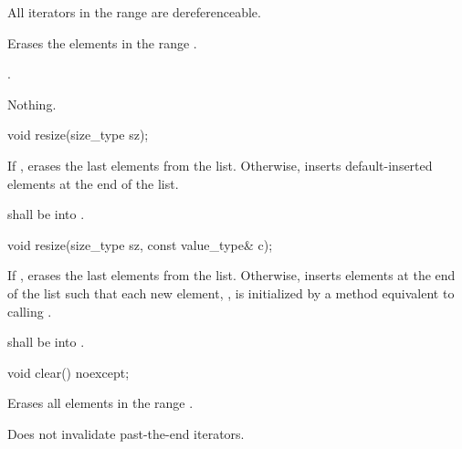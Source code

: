 \begin{itemdescr}
\pnum
\requires All iterators in the range  are dereferenceable.

\pnum
\effects Erases the elements in the range .

\pnum
\returns {}.

\pnum
\throws Nothing.
\end{itemdescr}

%
%
\begin{itemdecl}
void resize(size_type sz);
\end{itemdecl}

\begin{itemdescr}
\pnum
\effects If , erases the last  elements from the list. Otherwise, inserts  default-inserted
elements at the end of the list.

\pnum
\requires {} shall be  into .
\end{itemdescr}

\begin{itemdecl}
void resize(size_type sz, const value_type& c);
\end{itemdecl}

\begin{itemdescr}
\pnum
\effects If , erases the last  elements from the list. Otherwise, inserts   
elements at the end of the list such that each new element, , is initialized
by a method equivalent to calling
.

\pnum
\requires {} shall be  into .
\end{itemdescr}


%
%
\begin{itemdecl}
void clear() noexcept;
\end{itemdecl}

\begin{itemdescr}
\pnum
\effects Erases all elements in the range .

\pnum
\remarks Does not invalidate past-the-end iterators.
\end{itemdescr}

